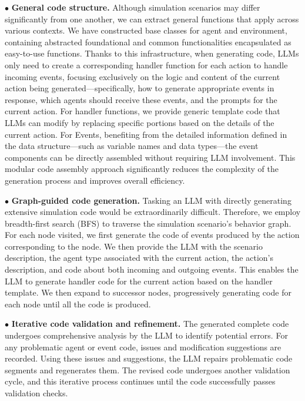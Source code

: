 \documentclass{article}
\theoremstyle{definition}
\theoremstyle{theorem}
\theoremstyle{proof}
\theoremstyle{remark}
\begin{document}
    $\bullet$ \textbf{General code structure.} Although simulation scenarios may differ significantly from one another, we can extract general functions that apply across various contexts. We have constructed base classes for agent and environment, containing abstracted foundational and common functionalities encapsulated as easy-to-use functions. Thanks to this infrastructure, when generating code, LLMs only need to create a corresponding handler function for each action to handle incoming events, focusing exclusively on the logic and content of the current action being generated—specifically, how to generate appropriate events in response, which agents should receive these events, and the prompts for the current action. For handler functions, we provide generic template code that LLMs can modify by replacing specific portions based on the details of the current action. For Events, benefiting from the detailed information defined in the data structure—such as variable names and data types—the event components can be directly assembled without requiring LLM involvement. 
    This modular code assembly approach significantly reduces the complexity of the generation process and improves overall efficiency.
    
    $\bullet$ \textbf{Graph-guided code generation.} Tasking an LLM with directly generating extensive simulation code would be extraordinarily difficult. Therefore, we employ breadth-first search (BFS) to traverse the simulation scenario's behavior graph. For each node visited, we first generate the code of events produced by the action corresponding to the node. We then provide the LLM with the scenario description, the agent type associated with the current action, the action's description, and code about both incoming and outgoing events. This enables the LLM to generate handler code for the current action based on the handler template. We then expand to successor nodes, progressively generating code for each node until all the code is produced.
    
    $\bullet$ \textbf{Iterative code validation and refinement.} The generated complete code undergoes comprehensive analysis by the LLM to identify potential errors. For any problematic agent or event code, issues and modification suggestions are recorded. Using these issues and suggestions, the LLM repairs problematic code segments and regenerates them. The revised code undergoes another validation cycle, and this iterative process continues until the code successfully passes validation checks.
\end{document}
